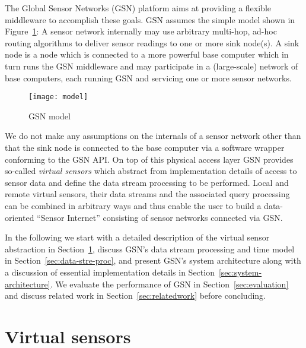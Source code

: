 The Global Sensor Networks (GSN) platform aims at providing a flexible
middleware to accomplish these goals.  GSN assumes the simple model
shown in Figure~\ref{fig:setup}: A sensor network internally may use
arbitrary multi-hop, ad-hoc routing algorithms to deliver sensor
readings to one or more sink node(s). A sink node is a node which is
connected to a more powerful base computer which in turn runs the GSN
middleware and may participate in a (large-scale) network of base
computers, each running GSN and servicing one or more sensor networks.

\begin{figure}
  \centering
  \texttt{[image: model]}
  \caption{GSN model}
  \label{fig:setup}
\end{figure}

We do not make any assumptions on the internals of a sensor network
other than that the sink node is connected to the base computer via a
software wrapper conforming to the GSN API. On top of this physical
access layer GSN provides so-called \textit{virtual sensors} which
abstract from implementation details of access to sensor data and
define the data stream processing to be performed. Local and remote
virtual sensors, their data streams and the associated query
processing can be combined in arbitrary ways and thus enable the user
to build a data-oriented ``Sensor Internet'' consisting of sensor
networks connected via GSN.

In the following we start with a detailed description of the virtual
sensor abstraction in Section~\ref{sec:virt-sens-spec}, discuss GSN's
data stream processing and time model in
Section~\ref{sec:data-stre-proc}, and present GSN's system architecture
along with a discussion of essential implementation details
in Section~\ref{sec:system-architecture}. We
evaluate the performance of GSN in Section~\ref{sec:evaluation} and
discuss related work in Section~\ref{sec:relatedwork} before
concluding.

\section{Virtual sensors}
\label{sec:virt-sens-spec}

